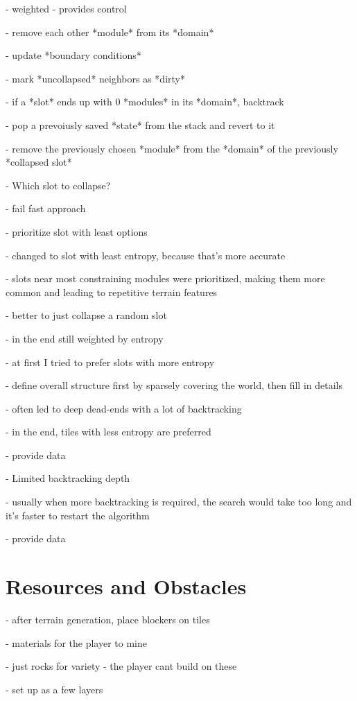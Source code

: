 - weighted - provides control

- remove each other *module* from its *domain*

- update *boundary conditions*

- mark *uncollapsed* neighbors as *dirty*

- if a *slot* ends up with 0 *modules* in its *domain*, backtrack

- pop a prevoiusly saved *state* from the stack and revert to it

- remove the previously chosen *module* from the *domain* of the previously *collapsed slot*


- Which slot to collapse?

- fail fast approach

- prioritize slot with least options

- changed to slot with least entropy, because that's more accurate

- slots near most constraining modules were prioritized, making them more common and leading to repetitive terrain features

- better to just collapse a random slot

- in the end still weighted by entropy

- at first I tried to prefer slots with more entropy

- define overall structure first by sparsely covering the world, then fill in details

- often led to deep dead-ends with a lot of backtracking

- in the end, tiles with less entropy are preferred

- provide data

- Limited backtracking depth

- usually when more backtracking is required, the search would take too long and it's faster to restart the algorithm

- provide data

\section{Resources and Obstacles}

- after terrain generation, place blockers on tiles

- materials for the player to mine

- just rocks for variety - the player cant build on these

- set up as a few layers

